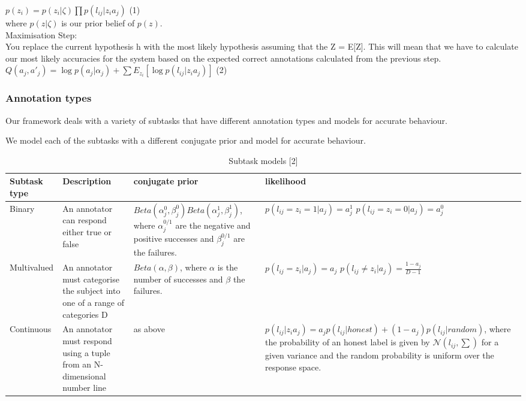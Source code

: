 \documentclass[11pt]{article}
\begin{document}
$ p(z_{i}) = p(z_{i}|\zeta) \prod p (l_{ij} | z_{i} a_{j}) $ (1)\\

where $p(z|\zeta)$ is our prior belief of $p(z)$.\\

Maximisation Step:\\
You replace the current hypothesis h with the most likely hypothesis assuming that the Z = E[Z]. This will mean that we have to calculate our most likely accuracies for the system based on the expected correct annotations calculated from the previous step.\\

$ Q(a_{j},a\prime_{j}) = \log p(a_{j}|\alpha_{j}) + \sum E_{z_{i}} [\log p (l_{ij} | z_{i} a_{j})]$ (2)\\

\subsubsection{Annotation types}

Our framework deals with a variety of subtasks that have different annotation types and models for accurate behaviour.

We model each of the subtasks with a different conjugate prior and model for accurate behaviour.\\

\begin{table}[htdp]
\caption{Subtask models [2]}
\begin{center}
\begin{tabular}{|p{2cm}|p{5cm}|p{4cm}|p{4cm}|}
Subtask type & Description & conjugate prior & likelihood \\
\hline
Binary & An annotator can respond either true or false & $Beta(\alpha_{j}^{0}, \beta_{j}^{0})Beta(\alpha_{j}^{1},\beta_{j}^{1})$, where $\alpha_{j}^{0/1}$ are the negative and positive successes and $\beta_{j}^{0/1}$ are the failures.& $p(l_{ij} = z_{i} = 1 | a_{j}) = a_{j}^{1}$ $p(l_{ij} = z_{i} = 0 | a_{j}) = a_{j}^{0}$\\ [2cm]

Multivalued & An annotator must categorise the subject into one of a range of categories D & $Beta(\alpha, \beta)$, where $\alpha$ is the number of successes and $\beta$ the failures.  &  $p(l_{ij} = z_{i}| a_{j}) = a_{j}$ $p(l_{ij} \ne z_{i} | a_{j}) = \frac{1 - a_{j}}{D - 1}$\\ [1cm]

Continuous & An annotator must respond using a tuple from an N-dimensional number line & as above &  $p(l_{ij} | z_{i} a_{j}) = a_{j} p(l_{ij}|honest) + (1- a_{j}) p(l_{ij}|random)$, where the probability of an honest label is given by $\mathcal{N}(l_{ij}, \sum)$ for a given variance and the random probability is uniform over the response space.\\
\end{tabular}
\end{center}
\label{models}
\end{table}
\end{document}
